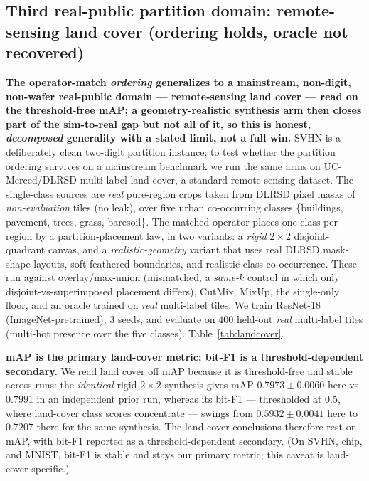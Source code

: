 \documentclass[11pt]{article}
\begin{document}
\subsection{Third real-public partition domain: remote-sensing land cover (ordering holds, oracle not recovered)}\label{sec:landcover}
\textbf{The operator-match \emph{ordering} generalizes to a mainstream, non-digit,
non-wafer real-public domain --- remote-sensing land cover --- read on the threshold-free
mAP; a geometry-realistic synthesis arm then closes part of the sim-to-real gap but not all
of it, so this is honest, \emph{decomposed} generality with a stated limit, not a full win.}
SVHN is a deliberately clean two-digit partition instance; to test whether the partition
ordering survives on a mainstream benchmark we run the same arms on UC-Merced/DLRSD
multi-label land cover, a standard remote-sensing dataset. The single-class sources are
\emph{real} pure-region crops taken from DLRSD pixel masks of \emph{non-evaluation} tiles
(no leak), over five urban co-occurring classes \{buildings, pavement, trees, grass,
baresoil\}. The matched operator places one class per region by a partition-placement law,
in two variants: a \emph{rigid} $2\times2$ disjoint-quadrant canvas, and a
\emph{realistic-geometry} variant that uses real DLRSD mask-shape layouts, soft feathered
boundaries, and realistic class co-occurrence. These run against overlay/max-union
(mismatched, a \emph{same-$k$} control in which only disjoint-vs-superimposed placement
differs), CutMix, MixUp, the single-only floor, and an oracle trained on \emph{real}
multi-label tiles. We train ResNet-18 (ImageNet-pretrained), $3$ seeds, and evaluate on
$400$ held-out \emph{real} multi-label tiles (multi-hot presence over the five classes).
Table~\ref{tab:landcover}.

\textbf{mAP is the primary land-cover metric; bit-F1 is a threshold-dependent secondary.}
We read land cover off mAP because it is threshold-free and stable across runs: the
\emph{identical} rigid $2\times2$ synthesis gives mAP $0.7973 \pm 0.0060$ here vs $0.7991$
in an independent prior run, whereas its bit-F1 --- thresholded at $0.5$, where land-cover
class scores concentrate --- swings from $0.5932 \pm 0.0041$ here to $0.7207$ there for the
same synthesis. The land-cover conclusions therefore rest on mAP, with bit-F1 reported as a
threshold-dependent secondary. (On SVHN, chip, and MNIST, bit-F1 is stable and stays our
primary metric; this caveat is land-cover-specific.)
\end{document}
